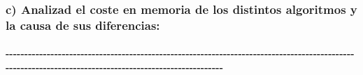 \documentclass[11pt]{article}
\begin{document}
    \subsubsection{c) Analizad el coste en memoria de los distintos
algoritmos y la causa de sus
diferencias:}\label{c-analizad-el-coste-en-memoria-de-los-distintos-algoritmos-y-la-causa-de-sus-diferencias}

    \paragraph{-\/-\/-\/-\/-\/-\/-\/-\/-\/-\/-\/-\/-\/-\/-\/-\/-\/-\/-\/-\/-\/-\/-\/-\/-\/-\/-\/-\/-\/-\/-\/-\/-\/-\/-\/-\/-\/-\/-\/-\/-\/-\/-\/-\/-\/-\/-\/-\/-\/-\/-\/-\/-\/-\/-\/-\/-\/-\/-\/-\/-\/-\/-\/-\/-\/-\/-\/-\/-\/-\/-\/-\/-\/-\/-\/-\/-\/-\/-\/-\/-\/-\/-\/-\/-\/-\/-\/-\/-\/-\/-\/-\/-\/-\/-\/-\/-\/-\/-\/-\/-\/-\/-\/-\/-\/-\/-\/-\/-\/-\/-\/-\/-\/-\/-\/-\/-\/-\/-\/-\/-\/-\/-\/-\/-\/-\/-\/-\/-\/-\/-\/-\/-\/-\/-\/-\/-\/-\/-\/-\/-\/-\/-\/-\/-\/-\/-\/-\/-\/-\/-}\label{section}
\end{document}

